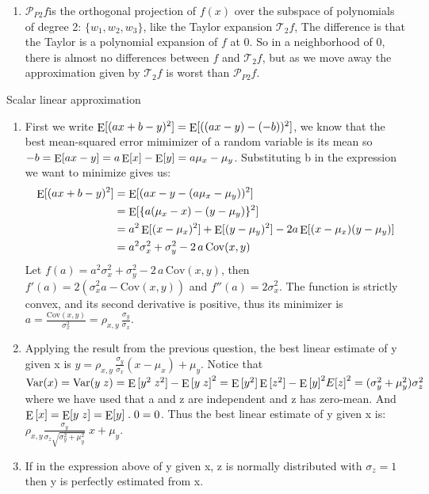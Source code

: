 \documentclass[10pt]{article}
\DeclareMathOperator*{\E}{\rm E}
\newcommand{\be}{\begin{enumerate}}
\newcommand{\ee}{\end{enumerate}}
\newcommand{\0}{\mat{0}}
\newcommand{\Var}{\mathrm{Var}}
\newcommand{\Cov}{\mathrm{Cov}}
\begin{document}
\begin{enumerate}
	\item $\mathcal{P}_{P2} f$is the orthogonal projection of $f(x)$ over the subspace of polynomials of degree 2: $\{ w_1, w_2, w_3 \}$, like the Taylor expansion $\mathcal{T}_2 f$, The difference is that the Taylor is a polynomial expansion of $f$ at 0. So in a neighborhood of $0$, there is almost no differences between $f$ and $\mathcal{T}_2 f$, but as we move away the approximation given  by $\mathcal{T}_2 f$ is worst than  $\mathcal{P}_{P2} f$. 
\ee	

\item Scalar linear approximation
\be
	\item First we write $\E[(a x + b - y)^2] = \E[((a x -y) - (-b))^2]$, we know that the best mean-squared error mimimizer of a random variable is its mean so $-b=\E[ax-y] = a \E[x] - \E[y]= a \mu_x - \mu_y$.
	Substituting b in the expression we want to minimize gives us:
	\begin{align*}
		\E[(a x + b - y)^2] 	&= \E[ ( a x - y -  ( a \mu_x - \mu_y) )^2 ] \\
						&= \E[ \{ a (\mu_x - x)  - (y-\mu_y)  \}^2 ] \\
						&= a^2 \E[(x - \mu_x)^2]  + \E[ (y-\mu_y)^2]  -2 a \E[(x - \mu_x) (y-\mu_y)] \\
						&= a^2 \sigma_x^2 + \sigma_y^2 -2\, a\, \Cov(x,y)
	\end{align*}
	Let $f(a) =  a^2 \sigma_x^2 + \sigma_y^2 -2\, a\, \Cov(x,y)$, then $f'(a) = 2 (\sigma_x^2 a - \Cov(x,y))$ and $f''(a) = 2 \sigma_x^2 $.
	The function is strictly convex, and its second derivative is positive, thus its minimizer is $a = \frac{ \Cov(x,y)} {\sigma_x^2} = \rho_{x,y}\, \frac{\sigma_y}{\sigma_x}$.
	
	\item Applying the result from the previous question, the best linear estimate of y given x is $y = \rho_{x,y}\, \frac{\sigma_y}{\sigma_x} (x - \mu_x)  + \mu_y$.
	Notice that $\Var{(x)} = \Var{(y \; z)} = \E{[y^2 \; z^2]} - \E{[y \; z]}^2 = \E{[y^2]}  \E{[z^2]} - \E{[y]}^2  E{[z]}^2 = (\sigma_y^2 + \mu_y^2) \sigma_z^2$ where we have used that a and z are independent and z has zero-mean. And $\E{[x]} = \E[y \; z] = \E[y] \; . \; 0 = 0$. Thus the  best linear estimate of y given x is: $\rho_{x,y} \frac{\sigma_y} {\sigma_z \sqrt{\sigma_y^2 + \mu_y^2}} \; x + \mu_y$.
	 
	 \item If in the expression above of y given x, z is normally distributed with $\sigma_z =1$ then y is perfectly estimated from x.  
 

\end{enumerate}
\end{document}
